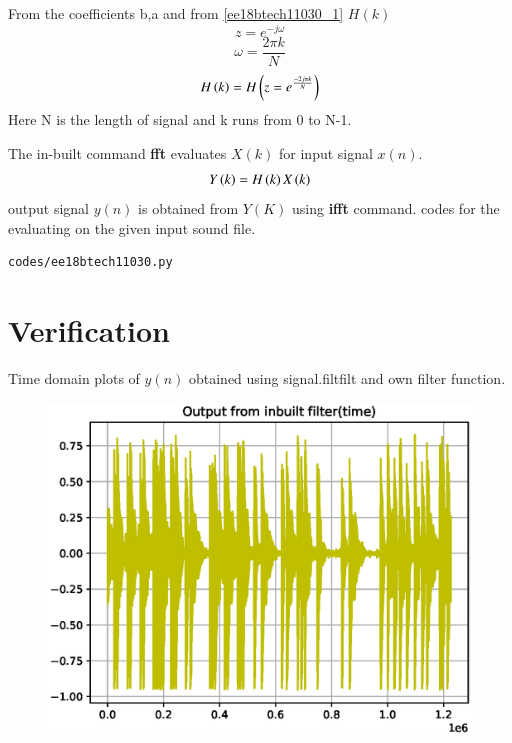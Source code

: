 \documentclass[journal,12pt,twocolumn]{IEEEtran}
\begin{document}
From the coefficients b,a and from \eqref{ee18btech11030_1} $H(k)$
\begin{equation}
z = e^{-j \omega}
\end{equation}
\begin{equation}
\omega = \frac{2\pi k}{N}
\end{equation}
\begin{equation}
H\left(k\right) = H\left(z = e^{\frac{-2j \pi k}{N}}\right)
\end{equation}
Here N is the length of signal and k runs from 0 to N-1.

The in-built command \textbf{fft}  evaluates $X(k)$ for input signal $x(n)$.
\begin{align}
    Y\left(k\right) = H\left(k\right)X\left(k\right)
\end{align}
output signal  $y(n)$ is obtained from $Y(K)$ using \textbf{ifft} command.
\newline
codes for the evaluating on the given input sound file. 
\begin{lstlisting}
codes/ee18btech11030.py
\end{lstlisting}
\section{Verification}

Time domain plots of $y(n)$ obtained using signal.filtfilt and own filter function.
\begin{figure}[!ht]
\centering
\includegraphics[width=1\columnwidth,height=0.8\columnwidth]{./figs/ee18btech11030.eps}
\caption{}
\label{fig:ee18btech11030}
\end{figure}
\end{document}
